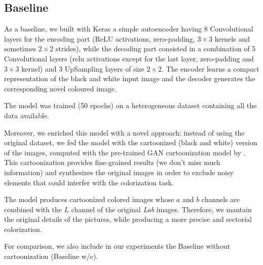 \subsection{Baseline}
As a baseline, we built with Keras a simple autoencoder having 8 Convolutional layers for the encoding part (ReLU activations, zero-padding, $3\times3$ kernels and sometimes $2\times2$ strides), while the decoding part consisted in a combination of 5 Convolutional layers (relu activations except for the last layer, zero-padding and $3\times3$ kernel) and 3 UpSampling layers of size $2\times2$. The encoder learns a compact representation of the black and white input image and the decoder generates the corresponding novel coloured image.

The model was trained (50 epochs) on a heterogeneous dataset containing all the data available.

Moreover, we enriched this model with a novel approach: instead of using the original dataset, we fed the model with the cartoonized (black and white) version of the images, computed with the pre-trained GAN cartoonization model by \cite{cartoonize}. This cartoonization provides fine-grained results (we don't miss much information) and synthesizes the original images in order to exclude noisy elements that could interfer with the colorization task.

The model produces cartoonized colored images whose $a$ and $b$ channels are combined with the $L$ channel of the original \textit{Lab} images. Therefore, we mantain the original details of the pictures, while producing a more precise and sectorial colorization.

For comparison, we also include in our experiments the Baseline without cartoonization (Baseline w/c).
